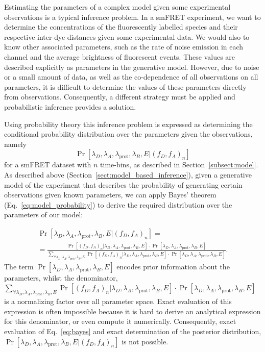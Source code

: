 Estimating the parameters of a complex model given some experimental observations is a typical inference problem. In a smFRET experiment, we want to determine the concentrations of the fluorescently labelled species and their respective inter-dye distances given some experimental data. We would also to know other associated parameters, such as the rate of noise emission in each channel and the average brightness of fluorescent events. These values are described explicitly as parameters in the generative model. However, due to noise or a small amount of data, as well as the co-dependence of all observations on all parameters, it is difficult to determine the values of these parameters directly from observations. Consequently, a different strategy must be applied and probabilistic inference provides a solution.

Using probability theory this inference problem is expressed as determining the conditional probability distribution over the parameters given the observations, namely $$\Pr[\lambda_D, \lambda_A, \lambda_{\text{prot}}, \lambda_B, E | (f_D, f_A)_n]$$ for a smFRET dataset with $n$ time-bins, as described in Section~\ref{subsect:model}. As described above (Section~\ref{sect:model_based_inference}), given a generative model of the experiment that describes the probability of generating certain observations given known parameters, we can apply Bayes' theorem (Eq.~\ref{eq:model_probability}) to derive the required distribution over the parameters of our model:

\begin{multline}
\Pr[\lambda_D, \lambda_A, \lambda_{\text{prot}}, \lambda_B, E | (f_D, f_A)_n] = \\ = \frac{\Pr[(f_D, f_A)_n |\lambda_D, \lambda_A, \lambda_{\text{prot}}, \lambda_B, E] \cdot \Pr[\lambda_D, \lambda_A, \lambda_{\text{prot}}, \lambda_B, E]}
{\sum_{\forall \lambda_D, \lambda_A, \lambda_{\text{prot}}, \lambda_B, E} \Pr[(f_D, f_A)_n | \lambda_D, \lambda_A, \lambda_{\text{prot}}, \lambda_B, E] \cdot \Pr[\lambda_D, \lambda_A, \lambda_{\text{prot}}, \lambda_B, E]}. 
\label{eq:bayes}
\end{multline}
The term $\Pr[\lambda_D, \lambda_A, \lambda_{\text{prot}}, \lambda_B, E]$ encodes prior information about the parameters, whilst the denominator, $\sum_{\forall \lambda_D, \lambda_A, \lambda_{\text{prot}}, \lambda_B, E} \Pr[(f_D, f_A)_n | \lambda_D, \lambda_A, \lambda_{\text{prot}}, \lambda_B, E] \cdot \Pr[\lambda_D, \lambda_A, \lambda_{\text{prot}}, \lambda_B, E]$ is a normalizing factor over all parameter space. Exact evaluation of this expression is often impossible because it is hard to derive an analytical expression for this denominator, or even compute it numerically. Consequently, exact evaluation of Eq.~\ref{eq:bayes} and exact determination of the posterior distribution, $\Pr[\lambda_D, \lambda_A, \lambda_{\text{prot}}, \lambda_B, E | (f_D, f_A)_n]$ is not possible.

